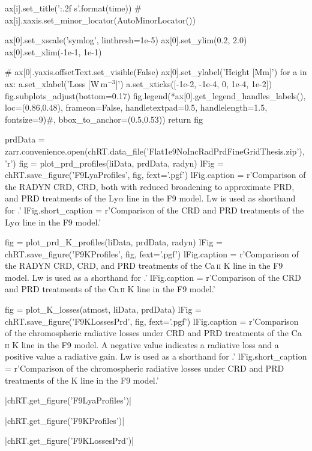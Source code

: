 \begin{pycode}[TimeDepRT]
        ax[i].set_title('{:.2f} s'.format(time))
        # ax[i].xaxis.set_minor_locator(AutoMinorLocator())

    ax[0].set_xscale('symlog', linthresh=1e-5)
    ax[0].set_ylim(0.2, 2.0)
    ax[0].set_xlim(-1e-1, 1e-1)

    # ax[0].yaxis.offsetText.set_visible(False)
    ax[0].set_ylabel('Height [Mm]')
    for a in ax:
        a.set_xlabel('Loss [W\,m$^{-3}$]')
        a.set_xticks([-1e-2, -1e-4, 0, 1e-4, 1e-2])
    fig.subplots_adjust(bottom=0.17)
    fig.legend(*ax[0].get_legend_handles_labels(), loc=(0.86,0.48), frameon=False,
               handletextpad=0.5, handlelength=1.5, fontsize=9)#, bbox_to_anchor=(0.5,0.53))
    return fig

prdData = zarr.convenience.open(chRT.data_file('Flat1e9NoIncRadPrdFineGridThesis.zip'), 'r')
fig = plot_prd_profiles(liData, prdData, radyn)
lFig = chRT.save_figure('F9LyaProfiles', fig, fext='.pgf')
lFig.caption = r'Comparison of the RADYN CRD, \Lw{} CRD, both with reduced broadening to approximate PRD, and \Lw{} PRD treatments of the Ly$\alpha$ line in the F9 model. Lw is used as shorthand for \Lw{}.'
lFig.short_caption = r'Comparison of the CRD and PRD treatments of the Ly$\alpha$ line in the F9 model.'

fig = plot_prd_K_profiles(liData, prdData, radyn)
lFig = chRT.save_figure('F9KProfiles', fig, fext='.pgf')
lFig.caption = r'Comparison of the RADYN CRD, \Lw{} CRD, and PRD treatments of the Ca\,\textsc{ii} K line in the F9 model. Lw is used as a shorthand for \Lw{}.'
lFig.caption = r'Comparison of the CRD and PRD treatments of the Ca\,\textsc{ii} K line in the F9 model.'

fig = plot_K_losses(atmost, liData, prdData)
lFig = chRT.save_figure('F9KLossesPrd', fig, fext='.pgf')
lFig.caption = r'Comparison of the chromospheric radiative losses under CRD and PRD treatments of the Ca\,\textsc{ii} K line in the F9 model. A negative value indicates a radiative loss and a positive value a radiative gain. Lw is used as a shorthand for \Lw{}.'
lFig.short_caption = r'Comparison of the chromospheric radiative losses under CRD and PRD treatments of the \Caii{} K line in the F9 model.'
\end{pycode}

\py[TimeDepRT]|chRT.get_figure('F9LyaProfiles')|

\py[TimeDepRT]|chRT.get_figure('F9KProfiles')|

\py[TimeDepRT]|chRT.get_figure('F9KLossesPrd')|


